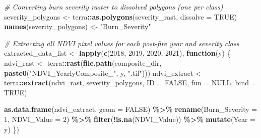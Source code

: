 \documentclass[
]{article}
\newenvironment{Shaded}{\begin{snugshade}}{\end{snugshade}}
\newcommand{\AttributeTok}[1]{\textcolor[rgb]{0.13,0.29,0.53}{#1}}
\newcommand{\CommentTok}[1]{\textcolor[rgb]{0.56,0.35,0.01}{\textit{#1}}}
\newcommand{\ConstantTok}[1]{\textcolor[rgb]{0.56,0.35,0.01}{#1}}
\newcommand{\ControlFlowTok}[1]{\textcolor[rgb]{0.13,0.29,0.53}{\textbf{#1}}}
\newcommand{\DecValTok}[1]{\textcolor[rgb]{0.00,0.00,0.81}{#1}}
\newcommand{\FunctionTok}[1]{\textcolor[rgb]{0.13,0.29,0.53}{\textbf{#1}}}
\newcommand{\NormalTok}[1]{#1}
\newcommand{\OtherTok}[1]{\textcolor[rgb]{0.56,0.35,0.01}{#1}}
\newcommand{\SpecialCharTok}[1]{\textcolor[rgb]{0.81,0.36,0.00}{\textbf{#1}}}
\newcommand{\StringTok}[1]{\textcolor[rgb]{0.31,0.60,0.02}{#1}}
\begin{document}
\begin{Shaded}
\begin{Highlighting}[]
\CommentTok{\# Converting burn severity raster to dissolved polygons (one per class)}
\NormalTok{severity\_polygons }\OtherTok{\textless{}{-}}\NormalTok{ terra}\SpecialCharTok{::}\FunctionTok{as.polygons}\NormalTok{(severity\_rast, }\AttributeTok{dissolve =} \ConstantTok{TRUE}\NormalTok{)}
\FunctionTok{names}\NormalTok{(severity\_polygons) }\OtherTok{\textless{}{-}} \StringTok{"Burn\_Severity"}

\CommentTok{\# Extracting all NDVI pixel values for each post{-}fire year and severity class}
\NormalTok{extracted\_data\_list }\OtherTok{\textless{}{-}} \FunctionTok{lapply}\NormalTok{(}\FunctionTok{c}\NormalTok{(}\DecValTok{2018}\NormalTok{, }\DecValTok{2019}\NormalTok{, }\DecValTok{2020}\NormalTok{, }\DecValTok{2021}\NormalTok{), }\ControlFlowTok{function}\NormalTok{(y) \{}
\NormalTok{  ndvi\_rast   }\OtherTok{\textless{}{-}}\NormalTok{ terra}\SpecialCharTok{::}\FunctionTok{rast}\NormalTok{(}\FunctionTok{file.path}\NormalTok{(composite\_dir,}
                                        \FunctionTok{paste0}\NormalTok{(}\StringTok{"NDVI\_YearlyComposite\_"}\NormalTok{, y, }\StringTok{".tif"}\NormalTok{)))}
\NormalTok{  ndvi\_extract }\OtherTok{\textless{}{-}}\NormalTok{ terra}\SpecialCharTok{::}\FunctionTok{extract}\NormalTok{(ndvi\_rast, severity\_polygons,}
                                  \AttributeTok{ID =} \ConstantTok{FALSE}\NormalTok{, }\AttributeTok{fun =} \ConstantTok{NULL}\NormalTok{, }\AttributeTok{bind =} \ConstantTok{TRUE}\NormalTok{)}

  \FunctionTok{as.data.frame}\NormalTok{(ndvi\_extract, }\AttributeTok{geom =} \ConstantTok{FALSE}\NormalTok{) }\SpecialCharTok{\%\textgreater{}\%}
    \FunctionTok{rename}\NormalTok{(}\AttributeTok{Burn\_Severity =} \DecValTok{1}\NormalTok{, }\AttributeTok{NDVI\_Value =} \DecValTok{2}\NormalTok{) }\SpecialCharTok{\%\textgreater{}\%}
    \FunctionTok{filter}\NormalTok{(}\SpecialCharTok{!}\FunctionTok{is.na}\NormalTok{(NDVI\_Value)) }\SpecialCharTok{\%\textgreater{}\%}
    \FunctionTok{mutate}\NormalTok{(}\AttributeTok{Year =}\NormalTok{ y)}
\NormalTok{\})}


\end{Highlighting}
\end{Shaded}
\end{document}
